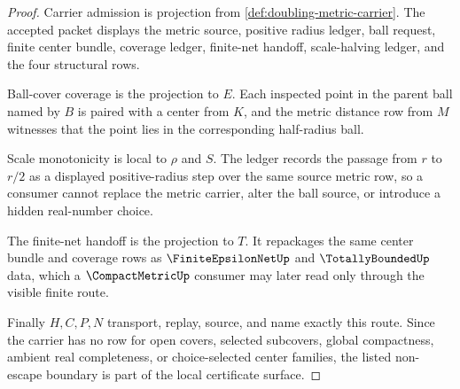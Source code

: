 \begin{proof}
Carrier admission is projection from \autoref{def:doubling-metric-carrier}. The accepted packet displays the metric source, positive radius ledger, ball request, finite center bundle, coverage ledger, finite-net handoff, scale-halving ledger, and the four structural rows.

Ball-cover coverage is the projection to $E$. Each inspected point in the parent ball named by $B$ is paired with a center from $K$, and the metric distance row from $M$ witnesses that the point lies in the corresponding half-radius ball.

Scale monotonicity is local to $\rho$ and $S$. The ledger records the passage from $r$ to $r/2$ as a displayed positive-radius step over the same source metric row, so a consumer cannot replace the metric carrier, alter the ball source, or introduce a hidden real-number choice.

The finite-net handoff is the projection to $T$. It repackages the same center bundle and coverage rows as $\FiniteEpsilonNetUp$ and $\TotallyBoundedUp$ data, which a $\CompactMetricUp$ consumer may later read only through the visible finite route.

Finally $H,C,P,N$ transport, replay, source, and name exactly this route. Since the carrier has no row for open covers, selected subcovers, global compactness, ambient real completeness, or choice-selected center families, the listed non-escape boundary is part of the local certificate surface.
\end{proof}

